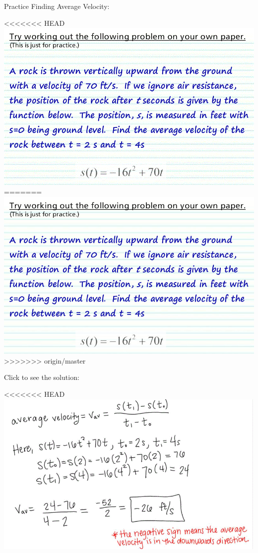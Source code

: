 \documentclass{ximera}
\begin{document}
Practice Finding Average Velocity:
\begin{foldable}
\begin{image}
<<<<<<< HEAD
\includegraphics{picture1.gif}
=======
\includegraphics{picture1.jpg}
>>>>>>> origin/master
\end{image}
Click to see the solution:
\begin{foldable}
\begin{image}
<<<<<<< HEAD
\includegraphics{picture2.gif}
\end{image}
\end{foldable}
\end{foldable}
\end{document}
